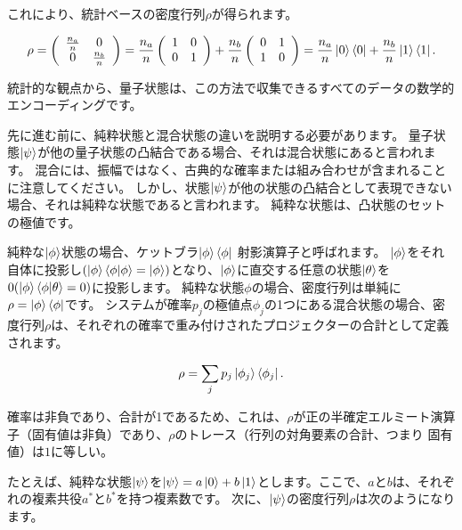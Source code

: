 これにより、統計ベースの密度行列$\rho$が得られます。



\begin{equation}
\label{239}
\rho
=
\left( \begin{array}{cc}
\frac{n_a}{n} & 0  \\
0 & \frac{n_b}{n}
\end{array} \right)
=
\frac{n_a}{n}
\left( \begin{array}{cc}
1 & 0  \\
0 & 1
\end{array} \right)
+
\frac{n_b}{n}
\left( \begin{array}{cc}
0 & 1  \\
1 & 0
\end{array} \right)
=
\frac{n_a}{n} \ket{0} \bra{0}
+
\frac{n_b}{n} \ket{1} \bra{1}.
\end{equation}

統計的な観点から、量子状態は、この方法で収集できるすべてのデータの数学的エンコーディングです。

先に進む前に、純粋状態と混合状態の違いを説明する必要があります。
量子状態$\ket{\psi}$が他の量子状態の凸結合である場合、それは混合状態にあると言われます。
混合には、振幅ではなく、古典的な確率または組み合わせが含まれることに注意してください。
  しかし、状態$\ket{\psi}$が他の状態の凸結合として表現できない場合、それは純粋な状態であると言われます。
純粋な状態は、凸状態のセットの極値です。

純粋な$\ket{\phi}$状態の場合、ケットブラ$\ket{\phi} \bra{\phi}$ 射影演算子と呼ばれます。 $\ket{\phi}$をそれ自体に投影し$(\ket{\phi} \braket{\phi | \phi} = \ket{\phi}) $となり、$\ket{\phi}$に直交する任意の状態$\ket{\theta}$を$ 0 ( \ket{\phi} \braket{\phi | \theta} =0)$に投影します。 
純粋な状態$ \phi$の場合、密度行列は単純に $ \rho = \ket{\phi} \bra{\phi}$です。 システムが確率$p_j$の極値点$ \phi_j $の1つにある混合状態の場合、密度行列$\rho$は、それぞれの確率で重み付けされたプロジェクターの合計として定義されます。

\begin{equation}
\label{240}
\rho
=
\sum_j p_j \ket{\phi_j} \bra{\phi_j}.
\end{equation}

確率は非負であり、合計が1であるため、これは、$\rho$が正の半確定エルミート演算子（固有値は非負）であり、$\rho$のトレース（行列の対角要素の合計、つまり 固有値）は$1$に等しい。

たとえば、純粋な状態$\ket{\psi}$を$\ket{\psi} = a \ket{0}+ b\ket{1}$とします。ここで、$a$と$b$は、それぞれの複素共役$a^*$と$b^*$を持つ複素数です。 次に、$\ket{\psi}$の密度行列$\rho$は次のようになります。

